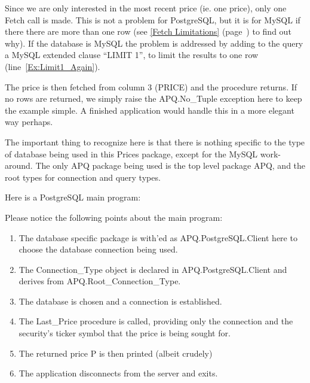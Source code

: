 \documentclass[english,letterpaper]{book}
\newcommand\Ref[1]{\textsection\ref{#1} (page~\pageref{#1})}
\begin{document}
Since we are only interested in the most recent price (ie. one price),
only one Fetch call is made. This is not a problem for PostgreSQL,
but it is for MySQL if there there are more than one row (see 
\Ref{Fetch Limitations} to find out why). If the database is MySQL
the problem is addressed by adding to the query a MySQL extended clause
``LIMIT 1'', to limit the results to one row (line~\ref{Ex:Limit1_Again}).

The price is then fetched from column 3 (PRICE) and the procedure
returns. If no rows are returned, we simply raise the APQ.No\_Tuple
exception here to keep the example simple. A finished application
would handle this in a more elegant way perhaps.

The important thing to recognize here is that there is nothing specific
to the type of database being used in this Prices package, except
for the MySQL work-around. The only APQ package being used is the
top level package APQ, and the root types for connection and query
types.

Here is a PostgreSQL main program:


Please notice the following points about the main program:

\begin{enumerate}
   \item The database specific package is with'ed as APQ.PostgreSQL.Client
         here to choose the database connection being used.
   \item The Connection\_Type object is declared in APQ.PostgreSQL.Client and
         derives from APQ.Root\_Connection\_Type.
   \item The database is chosen and a connection is established.
         \item The Last\_Price procedure is called, providing only the connection
         and the security's ticker symbol that the price is being sought for.
   \item The returned price P is then printed (albeit crudely)
   \item The application disconnects from the server and exits.
\end{enumerate}
\end{document}
